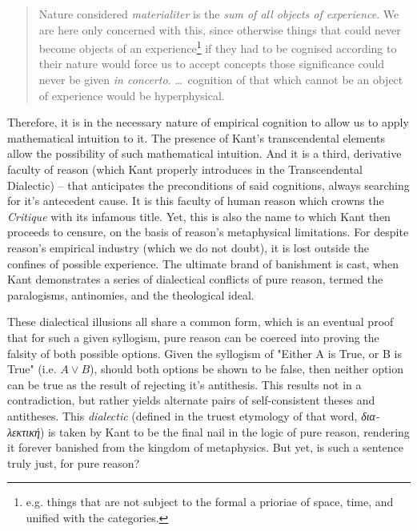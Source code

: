 \begin{quote}
  Nature considered \emph{materialiter} is the \emph{sum of all objects of experience}. We are here only concerned with this, since otherwise things that could never become objects of an experience\footnote{e.g. things that are not subject to the formal a prioriae of space, time, and unified with the categories.} if they had to be cognised according to their nature would force us to accept concepts those significance could never be given \emph{in concerto}. \ldots\ cognition of that which cannot be an object of experience would be hyperphysical.

  \autocite[4:296]{prolegomena}
\end{quote}

\noindent
Therefore, it is in the necessary nature of empirical cognition to allow us to apply mathematical intuition to it. The presence of Kant's transcendental elements allow the possibility of such mathematical intuition. And it is a third, derivative faculty of reason (which Kant properly introduces in the Transcendental Dialectic) -- that anticipates the preconditions of said cognitions, always searching for it's antecedent cause. It is this faculty of human reason which crowns the \emph{Critique} with its infamous title. Yet, this is also the name to which Kant then proceeds to censure, on the basis of reason's metaphysical limitations. For despite reason's empirical industry (which we do not doubt), it is lost outside the confines of possible experience. The ultimate brand of banishment is cast, when Kant demonstrates a series of dialectical conflicts of pure reason, termed the paralogisms, antinomies, and the theological ideal.

These dialectical illusions all share a common form, which is an eventual proof that for such a given syllogism, pure reason can be coerced into proving the falsity of both possible options. Given the syllogism of "Either A is True, or B is True" (i.e. $A \lor B$), should both options be shown to be false, then neither option can be true as the result of rejecting it's antithesis. This results not in a contradiction, but rather yields alternate pairs of self-consistent theses and antitheses. This \emph{dialectic} (defined in the truest etymology of that word, \emph{δια-λεκτική}) is taken by Kant to be the final nail in the logic of pure reason, rendering it forever banished from the kingdom of metaphysics. But yet, is such a sentence truly just, for pure reason?

